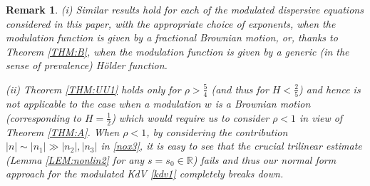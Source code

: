 \documentclass[letterpaper, 11pt,  reqno]{amsart}
\newtheorem{remark}[theorem]{Remark}
\newcommand{\1}{\hspace{0.5mm}\text{I}\hspace{0.5mm}}
\newcommand{\noi}{\noindent}
\newcommand{\R}{\mathbb{R}}
\numberwithin{equation}{section}
\numberwithin{theorem}{section}
\begin{document}
\begin{remark}\rm
(i)
Similar results hold for each of the modulated dispersive equations considered in this paper, with the appropriate choice of exponents, when the modulation function is given by a fractional Brownian motion, or,  thanks to Theorem \ref{THM:B}, when the modulation function is given by a generic (in the sense of prevalence) H\"older function.




\smallskip

\noi
(ii)  Theorem \ref{THM:UU1}
holds only for $\rho > \frac 54$
(and thus for $H < \frac 25$) and hence is not applicable
to the case when a modulation $w$ is a Brownian motion
(corresponding to $H= \frac 12$)
which would require us to consider $\rho < 1$
in view of Theorem \ref{THM:A}.
When $\rho < 1$, 
by considering the contribution $|n| \sim |n_1| \gg |n_2|, |n_3|$
in \eqref{nox3}, 
it is easy to see that the crucial trilinear estimate
(Lemma  \ref{LEM:nonlin2} for any  $s = s_0 \in \R$)
fails
and thus our normal form approach for the modulated KdV \eqref{kdv1}
completely breaks down.



\end{remark}
\end{document}
